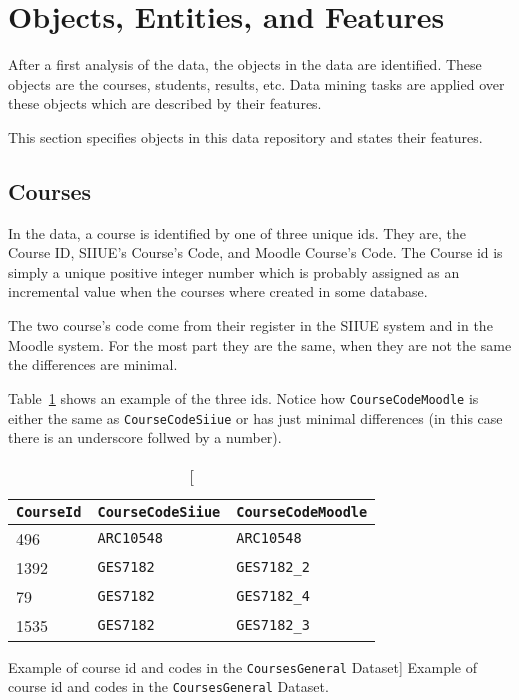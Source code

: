 \section{Objects, Entities, and Features}
\label{sec:objs_ents_feat}

After a first analysis of the data, the objects in the data are identified.
These objects are the courses, students, results, etc. Data mining tasks are
applied over these objects which are described by their features.

This section specifies objects in this data repository and states their
features.

\subsection{Courses}
\label{sec:data_courses}

In the data, a course is identified by one of three unique ids. They are, the
Course ID, SIIUE's Course's Code, and Moodle Course's Code. The Course id is
simply a unique positive integer number which is probably assigned as an
incremental value when the courses where created in some database.

The two course's code come from their register in the SIIUE system and in the
Moodle system. For the most part they are the same, when they are not the same
the differences are minimal.

Table~\ref{tab:course_code_example} shows an example of the three ids. Notice how \texttt{CourseCodeMoodle} is either the same as \texttt{CourseCodeSiiue} or has just minimal differences (in this case there is an underscore follwed by a number).

\begin{table}[h!]
    \centering

    \begin{tabular}{l l l}
\texttt{CourseId} & \texttt{CourseCodeSiiue} & \texttt{CourseCodeMoodle} \\ \hline
        496       & \texttt{ARC10548}        & \texttt{ARC10548}         \\
        1392      & \texttt{GES7182}         & \texttt{GES7182\_2}       \\
        79        & \texttt{GES7182}         & \texttt{GES7182\_4}       \\
        1535      & \texttt{GES7182}         & \texttt{GES7182\_3}       \\
    \end{tabular}

    \caption
        [Example of course id and codes in the \texttt{CoursesGeneral} Dataset]
        {Example of course id and codes in the \texttt{CoursesGeneral} Dataset.}

    \label{tab:course_code_example}
\end{table}


